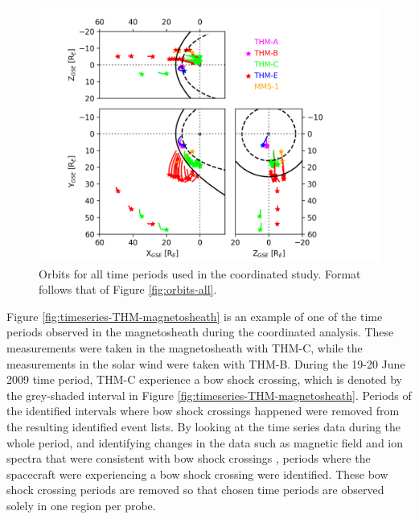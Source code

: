 \begin{figure}
    \centering
    \includegraphics[width=\linewidth]{Figures/Orbits/all_TE_orbits_xy_xz_yz_coordinated.png}
    \caption[Orbits for coordinated analysis time periods]{Orbits for all time periods used in the coordinated study. Format follows that of Figure \ref{fig:orbits-all}.}
    \label{fig:orbits-coordinated}
\end{figure}


Figure \ref{fig:timeseries-THM-magnetosheath} is an example of one of the time periods observed in the magnetosheath during the coordinated analysis. These measurements were taken in the magnetosheath with THM-C, while the measurements in the solar wind were taken with THM-B. During the 19-20 June 2009 time period, THM-C experience a bow shock crossing, which is denoted by the grey-shaded interval in Figure \ref{fig:timeseries-THM-magnetosheath}. Periods of the identified intervals where bow shock crossings happened were removed from the resulting identified event lists. By looking at the time series data during the whole period, and identifying changes in the data such as magnetic field and ion spectra that were consistent with bow shock crossings \cite{Lalti:2022,Trotta:2022}, periods where the spacecraft were experiencing a bow shock crossing were identified. These bow shock crossing periods are removed so that chosen time periods are observed solely in one region per probe.

